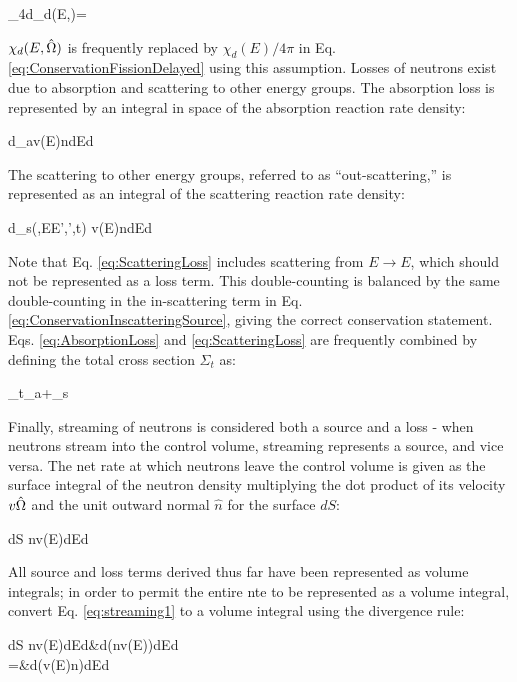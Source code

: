 \beq
\label{eq:delayed_isotropic}
\int_{4\pi}d\hO \chi_d(E,\hO)=
\eeq

\(\chi_d(E,\hat{\Omega})\) is frequently replaced by \(\chi_d(E)/4\pi\) in Eq. \eqref{eq:ConservationFissionDelayed} using this assumption. Losses of neutrons exist due to absorption and scattering to other energy groups. The absorption loss is represented by an integral in space of the absorption reaction rate density:

\beq
\label{eq:AbsorptionLoss}
\left\lbrack\int d\volume \Sigma_a\seat v(E)n\seat\right\rbrack dEd\hO
\eeq

The scattering to other energy groups, referred to as ``out-scattering,'' is represented as an integral of the scattering reaction rate density:

\beq
\label{eq:ScatteringLoss}
\left\lbrack\int d\volume \Sigma_s(,E\rightarrow E',\hO\rightarrow\hO',t) v(E)n\seat\right\rbrack dEd\hO
\eeq

Note that Eq. \eqref{eq:ScatteringLoss} includes scattering from \(E\rightarrow E\), which should not be represented as a loss term. This double-counting is balanced by the same double-counting in the in-scattering term in Eq. \eqref{eq:ConservationInscatteringSource}, giving the correct conservation statement. Eqs. \eqref{eq:AbsorptionLoss} and \eqref{eq:ScatteringLoss} are frequently combined by defining the total cross section \(\Sigma_t\) as:

\beq
\label{eq:TotalSigmaDef}
\Sigma_t\seatout\equiv\Sigma_a\seat+\Sigma_s\seatout
\eeq

Finally, streaming of neutrons is considered both a source and a loss - when neutrons stream into the control volume, streaming represents a source, and vice versa. The net rate at which neutrons leave the control volume is given as the surface integral of the neutron density multiplying the dot product of its velocity \(v\hat{\Omega}\) and the unit outward normal \(\hat{n}\) for the surface \(dS\):

\beq
\label{eq:streaming1}
\left\lbrack\int dS n\seat v(E)\hO\cdot{}\right\rbrack dEd\hO
\eeq

All source and loss terms derived thus far have been represented as volume integrals; in order to permit the entire \gls{nte} to be represented as a volume integral, convert Eq. \eqref{eq:streaming1} to a volume integral using the divergence rule:

\beqa
\label{eq:streaming2}
\left\lbrack\int dS n\seat v(E)\hO\cdot{}\right\rbrack dEd\hO\equiv&\left\lbrack\int d\volume\nabla\cdot\left(n\seat v(E)\hO\right)\right\rbrack dEd\hO\\
=&\left\lbrack\int d\volume\hO\cdot \nabla\left(v(E)n\seat\right)\right\rbrack dEd\hO
\eeqa

